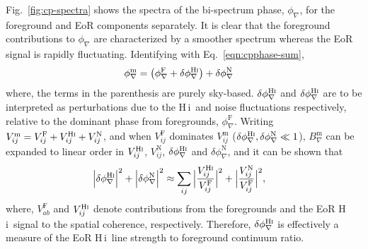 \documentclass[
reprint,
superscriptaddress,
amsmath,
amssymb,
aps,
prd
]{revtex4-1}
\newcommand{\HI}{H\,{\sc i}}
\begin{document}
Fig.~\ref{fig:cp-spectra} shows the spectra of the bi-spectrum phase, $\phi_\nabla$, for the foreground and EoR components separately. It is clear that the foreground contributions to $\phi_\nabla$ are characterized by a smoother spectrum whereas the EoR signal is rapidly fluctuating. Identifying with Eq.~\ref{eqn:cpphase-sum},
\begin{align}\label{eqn:cp-components}
  \phi_\nabla^\textrm{m} &= \left(\phi_\nabla^\textrm{F} + \delta\phi_\nabla^\textrm{H{\sc i}}\right) + \delta\phi_\nabla^\textrm{N}
\end{align}
where, the terms in the parenthesis are purely sky-based. $\delta\phi_\nabla^\textrm{H{\sc i}}$ and $\delta\phi_\nabla^\textrm{H{\sc i}}$ are to be interpreted as perturbations due to the \HI\ and noise fluctuations respectively, relative to the dominant phase from foregrounds, $\phi_\nabla^\textrm{F}$. Writing $V_{ij}^\textrm{m}=V_{ij}^\textrm{F}+V_{ij}^\textrm{H{\sc i}}+V_{ij}^\textrm{N}$, and when $V_{ij}^\textrm{F}$ dominates $V_{ij}^\textrm{m}$ ($\delta\phi_\nabla^\textrm{H{\sc i}}, \delta\phi_\nabla^\textrm{N} \ll 1$), $B_\nabla^\textrm{m}$ can be expanded to linear order in $V_{ij}^\textrm{H{\sc i}}$, $V_{ij}^\textrm{N}$, $\delta\phi_\nabla^\textrm{H{\sc i}}$ and $\delta\phi_\nabla^\textrm{N}$, and it can be shown that 
\begin{align}
  \Big|\delta\phi_\nabla^\textrm{H{\sc i}}\Big|^2 + \Big|\delta\phi_\nabla^\textrm{N}\Big|^2 &\approx \sum_{ij} \Big|\frac{V_{ij}^\textrm{H{\sc i}}}{V_{ij}^\textrm{F}}\Big|^2 + \Big|\frac{V_{ij}^\textrm{N}}{V_{ij}^\textrm{F}}\Big|^2,
\end{align}
where, $V_{ab}^\textrm{F}$ and $V_{ij}^\textrm{H{\sc i}}$ denote contributions from the foregrounds and the EoR \HI\ signal to the spatial coherence, respectively. Therefore, $\delta\phi_\nabla^\textrm{H{\sc i}}$ is effectively a measure of the EoR \HI\ line strength to foreground continuum ratio.
\end{document}
